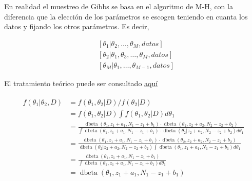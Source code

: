 \documentclass[
  12pt,
]{book}
\theoremstyle{definition}
\theoremstyle{definition}
\theoremstyle{definition}
\theoremstyle{remark}
\let\BeginKnitrBlock\begin \let\EndKnitrBlock\end
\begin{document}
\BeginKnitrBlock{remark}
{}En realidad el muestreo de Gibbs se basa en el algoritmo de M-H, con la diferencia que la elección de los parámetros se escogen teniendo en cuanta los datos y fijando los otros parámetros. Es decir,

\begin{align*}
&{\left[\theta_{1} | \theta_{2}, \ldots, \theta_{M}, datos \right]} \\
&{\left[\theta_{2} | \theta_{1}, \theta_{3}, \ldots, \theta_{M}, datos \right]} \\
&{\left[\theta_{M} | \theta_{1}, \ldots, \theta_{M-1}, datos \right]}
\end{align*}
\EndKnitrBlock{remark}

El tratamiento teórico puede ser consultado \href{https://www.ece.iastate.edu/~namrata/EE527_Spring08/l4c.pdf\#page=16}{aquí}

\begin{align*}\begin{aligned}
f\left(\theta_{1} | \theta_{2}, D\right) &=f\left(\theta_{1}, \theta_{2} | D\right) / f\left(\theta_{2} | D\right) \\
&=f\left(\theta_{1}, \theta_{2} | D\right) \int f\left(\theta_{1}, \theta_{2} | D\right)d \theta_{1}  \\
&=\frac{\operatorname{dbeta}\left(\theta_{1}, z_{1}+a_{1}, N_{1}-z_{1}+b_{1}\right) \cdot \operatorname{dbeta}\left(\theta_{2}, z_{2}+a_{2}, N_{2}-z_{2}+b_{2}\right)}{\int  \operatorname{dbeta}\left(\theta_{1}, z_{1}+a_{1}, N_{1}-z_{1}+b_{1}\right) \cdot \operatorname{dbeta}\left(\theta_{2} | z_{2}+a_{2}, N_{2}-z_{2}+b_{2}\right)d \theta_{1}} \\
&=\frac{\operatorname{dbeta}\left(\theta_{1}, z_{1}+a_{1}, N_{1}-z_{1}+b_{1}\right) \cdot \operatorname{dbeta}\left(\theta_{2}, z_{2}+a_{2}, N_{2}-z_{2}+b_{2}\right)}{\operatorname{dbeta}\left(\theta_{2} | z_{2}+a_{2}, N_{2}-z_{2}+b_{2}\right) \int  \operatorname{dbeta}\left(\theta_{1}, z_{1}+a_{1}, N_{1}-z_{1}+b_{1}\right)d \theta_{1}} \\
&=\frac{\operatorname{dbeta}\left(\theta_{1}, z_{1}+a_{1}, N_{1}-z_{1}+b_{1}\right)}{\int  \operatorname{dbeta}\left(\theta_{1}, z_{1}+a_{1}, N_{1}-z_{1}+b_{1}\right)d \theta_{1}} \\
&=\operatorname{dbeta}\left(\theta_{1}, z_{1}+a_{1}, N_{1}-z_{1}+b_{1}\right)
\end{aligned}\end{align*}
\end{document}
